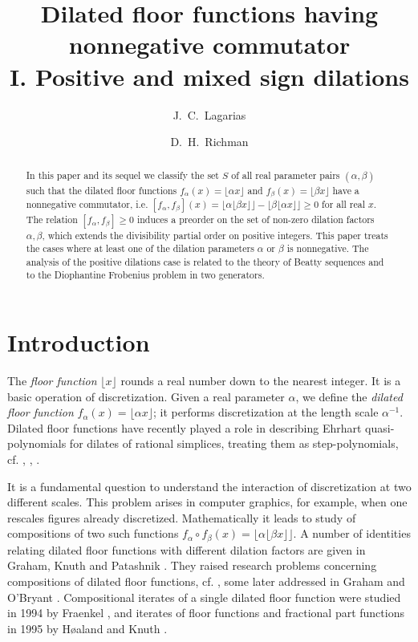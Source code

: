 \documentclass[11pt, letterpaper, reqno]{amsart}
\title[Dilated floor functions having nonnegative commutator I.]%
{Dilated floor functions having nonnegative commutator\\
I. Positive and mixed sign dilations}
\author{J.\ C.\ Lagarias}
\author{D.\ H.\ Richman}
\theoremstyle{definition}
\numberwithin{equation}{section}
\newcommand{\floor}[1]{\lfloor{#1}\rfloor}
\begin{document}
\begin{abstract}
In this paper and its sequel we classify the set $S$ of all real parameter pairs 
$(\alpha,\beta)$ such that the dilated floor functions 
$f_\alpha(x) = \lfloor{\alpha x}\rfloor$ and $f_\beta(x) = \lfloor{\beta x}\rfloor$ 
have a nonnegative commutator, i.e. 
$ [ f_{\alpha}, f_{\beta}](x) = \lfloor{\alpha \lfloor{\beta x}\rfloor}\rfloor - 
\lfloor{\beta \lfloor{\alpha x}\rfloor}\rfloor \geq 0$ 
for all real $x$. 
The relation $[f_\alpha,f_\beta]\geq 0$ induces a preorder on the set of non-zero dilation factors 
$\alpha, \beta$, which extends the divisibility partial order on positive integers. 
This paper treats the cases where at least one of the 
dilation parameters $\alpha$ or $\beta$ is nonnegative. 
The analysis of the positive dilations case is related to the theory of Beatty sequences 
and to the Diophantine Frobenius problem in two generators.
\end{abstract} 
\maketitle

\setcounter{tocdepth}{1}
\tableofcontents




\section{Introduction}

The {\em floor function}  
$\floor x $
rounds a real number down to the nearest integer. It is a basic operation of discretization.
Given a real parameter $\alpha$, we define the {\em dilated floor function} $f_\alpha(x)= \floor{\alpha x}$; it 
performs discretization at the length scale $\alpha^{-1}$.
Dilated floor functions have recently played a role in describing Ehrhart quasi-polynomials for
dilates of rational simplices, treating them as
step-polynomials, cf. \cite[Example 13]{BBDKV:2012}, \cite[Definition 23]{BBKV:2013}, \cite{BBDKV:2016}.

It is a fundamental question to understand the interaction of discretization at two different scales.
This problem arises in computer graphics, for example, when one rescales figures already discretized.
Mathematically it  leads to study of  compositions of two such functions 
$ f_{\alpha}\circ f_{\beta}(x) = \floor{\alpha \floor{\beta x}}$. 
A number of identities relating dilated floor functions with different dilation factors are given in 
Graham, Knuth and Patashnik \cite[Chap. 3]{GKP94}.
They raised research problems  concerning compositions of dilated floor functions, 
cf.  \cite[Research problem 50, p.101]{GKP94},
some later addressed in  Graham and O'Bryant \cite{GO10}. 
Compositional iterates of a single dilated  floor function were studied in 1994 by Fraenkel \cite{Fra94}, and iterates of floor functions and fractional part functions in 1995 by H\o{a}land and Knuth \cite{HK95}.
\end{document}

